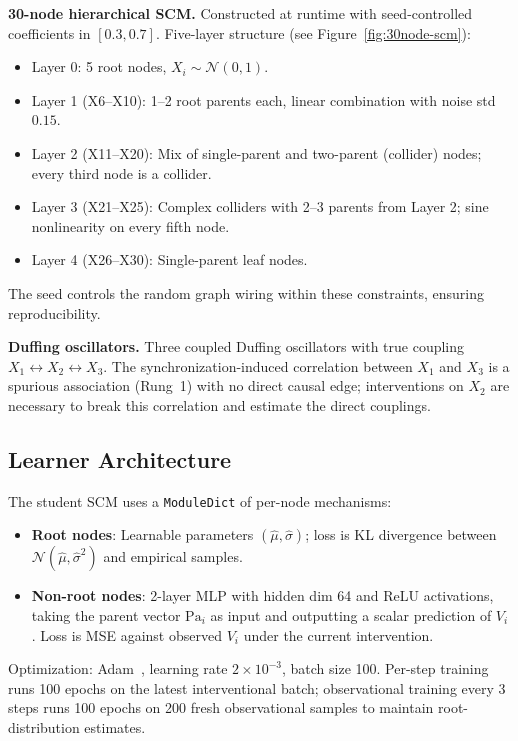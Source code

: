 \documentclass[twoside]{article}
\theoremstyle{plain}
\theoremstyle{definition}
\theoremstyle{remark}
\begin{document}
\textbf{30-node hierarchical SCM.} Constructed at runtime with seed-controlled coefficients in $[0.3, 0.7]$. Five-layer structure (see Figure~\ref{fig:30node-scm}):
\begin{itemize}[leftmargin=1.2em,topsep=0.2em,itemsep=0.1em]
\item Layer 0: 5 root nodes, $X_i \sim \mathcal{N}(0,1)$.
\item Layer 1 (X6--X10): 1--2 root parents each, linear combination with noise std $0.15$.
\item Layer 2 (X11--X20): Mix of single-parent and two-parent (collider) nodes; every third node is a collider.
\item Layer 3 (X21--X25): Complex colliders with 2--3 parents from Layer 2; sine nonlinearity on every fifth node.
\item Layer 4 (X26--X30): Single-parent leaf nodes.
\end{itemize}
The seed controls the random graph wiring within these constraints, ensuring reproducibility.

\textbf{Duffing oscillators.} Three coupled Duffing oscillators with true coupling $X_1 \leftrightarrow X_2 \leftrightarrow X_3$. The synchronization-induced correlation between $X_1$ and $X_3$ is a spurious association (Rung~1) with no direct causal edge; interventions on $X_2$ are necessary to break this correlation and estimate the direct couplings.

\subsection{Learner Architecture}
\label{app:learner}

The student SCM uses a \texttt{ModuleDict} of per-node mechanisms:
\begin{itemize}[leftmargin=1.2em,topsep=0.2em,itemsep=0.1em]
\item \textbf{Root nodes}: Learnable parameters $(\hat{\mu}, \hat{\sigma})$; loss is KL divergence between $\mathcal{N}(\hat{\mu}, \hat{\sigma}^2)$ and empirical samples.
\item \textbf{Non-root nodes}: 2-layer MLP with hidden dim 64 and ReLU activations, taking the parent vector $\text{Pa}_i$ as input and outputting a scalar prediction of $V_i$. Loss is MSE against observed $V_i$ under the current intervention.
\end{itemize}
Optimization: Adam~\citep{kingma2015adam}, learning rate $2 \times 10^{-3}$, batch size 100. Per-step training runs 100 epochs on the latest interventional batch; observational training every 3 steps runs 100 epochs on 200 fresh observational samples to maintain root-distribution estimates.
\end{document}

